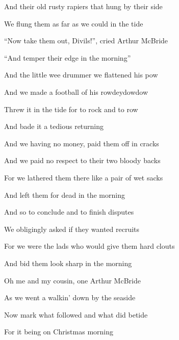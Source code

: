 \documentclass[letterpaper,10pt,english]{sphinxmanual}
\begin{document}
\begin{DUlineblock}{0em}
\item[] And their old rusty rapiers that hung by their side
\item[] We flung them as far as we could in the tide
\item[] “Now take them out, Divils!”, cried Arthur McBride
\item[] “And temper their edge in the morning”
\end{DUlineblock}

\begin{DUlineblock}{0em}
\item[] And the little wee drummer we flattened his pow
\item[] And we made a football of his rowdeydowdow
\item[] Threw it in the tide for to rock and to row
\item[] And bade it a tedious returning
\end{DUlineblock}

\begin{DUlineblock}{0em}
\item[] And we having no money, paid them off in cracks
\item[] And we paid no respect to their two bloody backs
\item[] For we lathered them there like a pair of wet sacks
\item[] And left them for dead in the morning
\end{DUlineblock}

\begin{DUlineblock}{0em}
\item[] And so to conclude and to finish disputes
\item[] We obligingly asked if they wanted recruits
\item[] For we were the lads who would give them hard clouts
\item[] And bid them look sharp in the morning
\end{DUlineblock}

\begin{DUlineblock}{0em}
\item[] Oh me and my cousin, one Arthur McBride
\item[] As we went a walkin’ down by the seaside
\item[] Now mark what followed and what did betide
\item[] For it being on Christmas morning
\end{DUlineblock}
\end{document}
